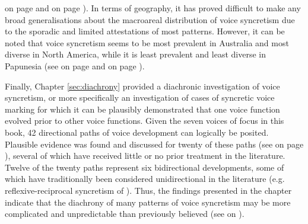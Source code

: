  on page \pageref{tab:ch6:voice-syncretism-simplex} and  on page \pageref{tab:ch6:voice-syncretism-maximal-simplex-macroarea}). In terms of geography, it has proved difficult to make any broad generalisations about the macroareal distribution of voice syncretism due to the sporadic and limited attestations of most patterns. However, it can be noted that voice syncretism seems to be most prevalent in Australia and most diverse in North America, while it is least prevalent and least diverse in Papunesia (see  on page \pageref{tab:ch6:voice-syncretism} and  on page \pageref{tab:ch6:voice-syncretism-macroarea-minimal}).

Finally, Chapter \ref{sec:diachrony} provided a diachronic investigation of voice syncretism, or more specifically an investigation of cases of syncretic voice marking for which it can be plausibly demonstrated that one voice function evolved prior to other voice functions. Given the seven voices of focus in this book, 42 directional paths of voice development can logically be posited. Plausible evidence was found and discussed for twenty of these paths (see  on page \pageref{tab:ch7:developmental-paths}), several of which have received little or no prior treatment in the literature. Twelve of the twenty paths represent six bidirectional developments, some of which have traditionally been considered unidirectional in the literature (e.g. reflexive-reciprocal syncretism of ). Thus, the findings presented in the chapter indicate that the diachrony of many patterns of voice syncretism may be more complicated and unpredictable than previously believed (see  on \pageref{fig:ch07:syncretism-diachrony}). 

